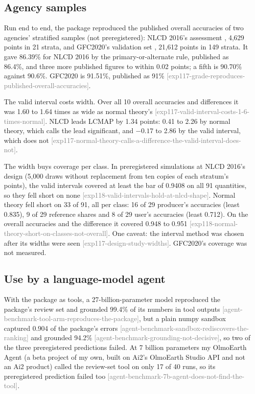 \documentclass[11pt,a4paper]{article}
\newcommand{\claim}[1]{{\scriptsize\textsf{\textcolor{gray}{[#1]}}}}
\begin{document}
\subsection{Agency samples}
\label{sec:res-agency}

Run end to end, the package reproduced the published overall accuracies of two agencies' stratified samples (not
preregistered): NLCD 2016's assessment \citep{wickham2021}, 4,629 points in 21 strata, and GFC2020's validation set
\citep{colditz2025,bourgoin2026}, 21,612 points in 149 strata. It gave 86.39\% for NLCD 2016 by the
primary-or-alternate rule, published as 86.4\%, and three more published figures to within 0.02 points; a fifth is
90.70\% against 90.6\%. GFC2020 is 91.51\%, published as 91\%
\claim{exp117-grade-reproduces-published-overall-accuracies}.

The valid interval costs width. Over all 10 overall accuracies and differences it was 1.60 to 1.64 times as wide as
normal theory's
\claim{exp117-valid-interval-costs-1-6-times-normal}. NLCD leads LCMAP by 1.34 points: 0.41 to 2.26 by normal theory,
which calls the lead significant, and $-0.17$ to 2.86 by the valid interval, which does not
\claim{exp117-normal-theory-calls-a-difference-the-valid-interval-does-not}.

The width buys coverage per class. In preregistered simulations at NLCD 2016's design (5,000 draws without
replacement from ten copies of each stratum's points), the valid intervals covered at least the bar of 0.9408 on all
91 quantities, so they fell short on none \claim{exp118-valid-intervals-hold-at-nlcd-shape}. Normal theory fell short
on 33 of 91, all per class: 16 of 29 producer's accuracies (least 0.835), 9 of 29 reference shares and 8 of 29 user's
accuracies (least 0.712). On the overall accuracies and the difference it covered 0.948 to 0.951
\claim{exp118-normal-theory-short-on-classes-not-overall}. One caveat: the interval method was chosen after its
widths were seen \claim{exp117-design-study-widths}. GFC2020's coverage was not measured.

\subsection{Use by a language-model agent}
\label{sec:res-agent}

With the package as tools, a 27-billion-parameter model reproduced the package's review set and grounded 99.4\% of
its numbers in tool outputs \claim{agent-benchmark-tool-arm-reproduces-the-package}, but a plain numpy sandbox
captured 0.904 of the package's errors \claim{agent-benchmark-sandbox-rediscovers-the-ranking} and grounded 94.2\%
\claim{agent-benchmark-grounding-not-decisive}, so two of the three preregistered predictions failed. At 7 billion
parameters my OlmoEarth Agent (a beta project of my own, built on Ai2's OlmoEarth Studio API and not an Ai2 product)
called the review-set tool on only 17 of 40 runs, so its preregistered prediction failed too
\claim{agent-benchmark-7b-agent-does-not-find-the-tool}.
\end{document}
